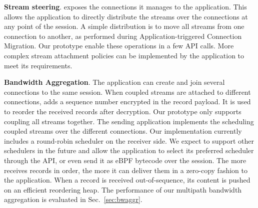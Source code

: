 \textbf{Stream steering}.
\tcpls exposes the \tcp connections it manages to the application. This allows 
the application to directly distribute the \tcpls streams over the \tcp 
connections at any point of the \tcpls session. A simple distribution is to 
move all \tcpls streams from one connection to another, as performed during 
Application-triggered Connection Migration. Our prototype enable these 
operations in a few API calls. More complex stream attachment policies can be 
implemented by the application to meet its requirements.

\textbf{Bandwidth Aggregation}.
The application can create and join several \tcp connections to
the same \tcpls session. When coupled streams are attached to
different \tcp connections, \tcpls adds a sequence number encrypted in the \tls 
record payload. It is used to reorder the received records 
after decryption. Our prototype only supports coupling all streams together.
The sending application implements the scheduling coupled streams over the 
different \tcpls connections.
Our implementation currently includes a round-robin scheduler on the receiver
side. We expect to
support other schedulers in the future and allow the application to select its 
preferred scheduler through the API, or even send it as eBPF bytecode over the 
session. The more \tcpls receives records in order, the more it can deliver 
them in a zero-copy fashion to the application. When a record is received 
out-of-sequence, its content is pushed on an efficient reordering heap. %
The performance of our multipath bandwidth aggregation is evaluated in
Sec.~\ref{sec:bwaggr}.

